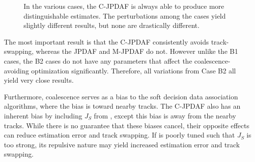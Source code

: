 \begin{figure}
{
\centerline{
	}
\centerline{
	}
\centerline{
	}
}
\caption{In the various cases, the C-JPDAF is always able to produce more distinguishable estimates.
The perturbations among the cases yield slightly different results, but none are drastically different.
}\label{fig:B2}
\end{figure}

The most important result is that the C-JPDAF consistently avoids track-swapping, whereas the JPDAF and M-JPDAF do not.
However unlike the B1 cases, the B2 cases do not have any parameters that affect the coalescence-avoiding optimization significantly.
Therefore, all variations from Case B2 all yield very close results.

Furthermore, coalescence serves as a bias to the soft decision data association algorithms, where the bias is toward nearby tracks. The C-JPDAF also has an inherent bias by including $J_S$ from , except this bias is away from the nearby tracks. While there is no guarantee that these biases cancel, their opposite effects can reduce estimation error and track swapping. If  is poorly tuned such that $J_S$ is too strong, its repulsive nature may yield increased estimation error and track swapping.


